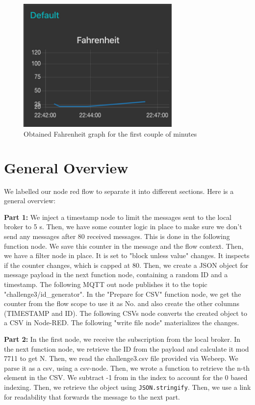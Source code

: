 \documentclass{article}
\begin{document}
\begin{figure}[htp]
    \centering
    \includegraphics[width=8cm]{Images/Plot.jpg}
    \caption{Obtained Fahrenheit graph for the first couple of minutes}
    \label{fig:galaxy}
\end{figure}

\section{General Overview}
We labelled our node red flow to separate it into different sections. Here is a general overview:

\textbf{Part 1:} We inject a timestamp node to limit the messages sent to the local broker to 5 s. Then, we have some counter logic in place to make sure we don't send any messages after 80 received messages. This is done in the following function node. We save this counter in the message and the flow context. Then, we have a filter node in place. It is set to "block unless value" changes. It inspects if the counter changes, which is capped at 80. Then, we create a JSON object for message payload in the next function node, containing a random ID and a timestamp. The following MQTT out node publishes it to the topic "challenge3/id\_generator". In the "Prepare for CSV" function node, we get the counter from the flow scope to use it as No. and also create the other columns (TIMESTAMP and ID). The following CSVs node converts the created object to a CSV in Node-RED. The following "write file node" materializes the changes.

\textbf{Part 2:} In the first node, we receive the subscription from the local broker. In the next function node, we retrieve the ID from the payload and calculate it mod 7711 to get N. Then, we read the challenge3.csv file provided via Webeep.
We parse it as a csv, using a csv-node. Then, we wrote a function to retrieve the n-th element in the CSV. We subtract -1 from in the index to account for the 0 based indexing. Then, we retrieve the object using \texttt{JSON.stringify}.
Then, we use a link for readability that forwards the message to the next part.
\end{document}
